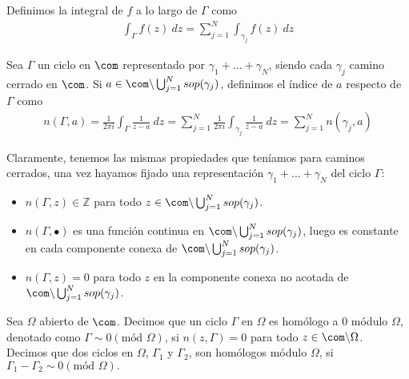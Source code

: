 \begin{defi}
Definimos la integral de $f$ a lo largo de $\Gamma$ como
\begin{align*}
    \int_{\Gamma} f(z) \ dz = \sum_{j=1}^{N} \int_{\gamma_j} f(z) \ dz
\end{align*}
\end{defi}

\begin{defi}
Sea $\Gamma$ un ciclo en $\com$ representado por $\gamma_1 + ... + \gamma_N$, siendo cada $\gamma_j$ camino cerrado en $\com$. Si $a \in \com \backslash \bigcup_{j=1}^{N} sop(\gamma_j)$, definimos el índice de $a$ respecto de $\Gamma$ como
\begin{align*}
    n(\Gamma,a) = \frac{1}{2\pi i} \int_{\Gamma} \frac{1}{z-a} \ dz =  \sum_{j=1}^{N} \frac{1}{2\pi i} \int_{\gamma_j} \frac{1}{z-a} \ dz = \sum_{j=1}^{N} n(\gamma_j,a)
\end{align*}
\end{defi}

\begin{obs}
Claramente, tenemos las mismas propiedades que teníamos para caminos cerrados, una vez hayamos fijado una representación $\gamma_1 + ... + \gamma_N$ del ciclo $\Gamma$:
\begin{itemize}
    \item $n(\Gamma,z) \in \mathbb{Z}$ para todo $z\in \com \backslash \bigcup_{j=1}^{N} sop(\gamma_j)$.
    \item $n(\Gamma,\bullet)$ es una función continua en $\com \backslash \bigcup_{j=1}^{N} sop(\gamma_j)$, luego es constante en cada componente conexa de $\com \backslash \bigcup_{j=1}^{N} sop(\gamma_j)$.
    \item $n(\Gamma,z) = 0$ para todo $z$ en la componente conexa no acotada de $\com \backslash \bigcup_{j=1}^{N} sop(\gamma_j)$.
\end{itemize}
\end{obs}

\begin{defi}
Sea $\Omega$ abierto de $\com$. Decimos que un ciclo $\Gamma$ en $\Omega$ es homólogo a 0 módulo $\Omega$, denotado como $\Gamma \sim 0 (\text{mód } \Omega)$, si $n(z,\Gamma) = 0$ para todo $z \in \com \backslash \Omega$.
\\
\newline
Decimos que dos ciclos en $\Omega$, $\Gamma_1$ y $\Gamma_2$, son homólogos módulo $\Omega$, si $\Gamma_1 - \Gamma_2 \sim 0 (\text{mód } \Omega).$
\end{defi}

